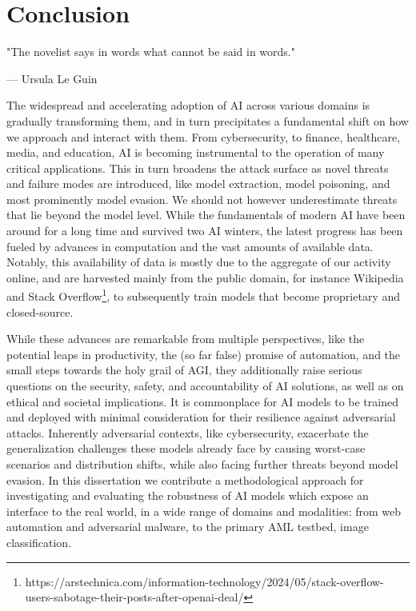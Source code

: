 \chapter{Conclusion}\label{ch:conclusion}

\epigraph{"The novelist says in words what cannot be said in words."}{--- Ursula Le Guin}

The widespread and accelerating adoption of \gls{AI} across various domains is gradually transforming them, and in turn precipitates a fundamental shift on how we approach and interact with them. 
From cybersecurity, to finance, healthcare, media, and education, AI is becoming instrumental to the operation of many critical applications.
This in turn broadens the attack surface as novel threats and failure modes are introduced, like model extraction, model poisoning, and most prominently model evasion.
We should not however underestimate threats that lie beyond the model level.
While the fundamentals of modern AI have been around for a long time and survived two \gls{AI} winters, the latest progress has been fueled by advances in computation and the vast amounts of available data.
Notably, this availability of data is mostly due to the aggregate of our activity online, and are harvested mainly from the public domain, for instance Wikipedia and Stack Overflow\footnote{https://arstechnica.com/information-technology/2024/05/stack-overflow-users-sabotage-their-posts-after-openai-deal/}, to subsequently train models that become proprietary and closed-source.

While these advances are remarkable from multiple perspectives, like the potential leaps in productivity, the (so far false) promise of automation, and the small steps towards the holy grail of \gls{AGI}, they additionally raise serious questions on the security, safety, and accountability of \gls{AI} solutions, as well as on ethical and societal implications.
It is commonplace for \gls{AI} models to be trained and deployed with minimal consideration for their resilience against adversarial attacks.
Inherently adversarial contexts, like cybersecurity, exacerbate the generalization challenges these models already face by causing worst-case scenarios and distribution shifts, while also facing further threats beyond model evasion.
In this dissertation we contribute a methodological approach for investigating and evaluating the robustness of AI models which expose an interface to the real world, in a wide range of domains and modalities: from web automation and adversarial malware, to the primary \gls{AML} testbed, image classification.

